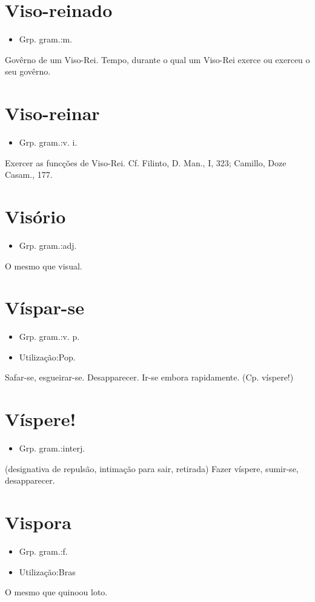 \documentclass{article}
\begin{document}
\section{Viso-reinado}
\begin{itemize}
\item {Grp. gram.:m.}
\end{itemize}
Govêrno de um Viso-Rei.
Tempo, durante o qual um Viso-Rei exerce ou exerceu o seu govêrno.
\section{Viso-reinar}
\begin{itemize}
\item {Grp. gram.:v. i.}
\end{itemize}
Exercer as funcções de Viso-Rei. Cf. Filinto, \textunderscore D. Man.\textunderscore , I, 323; Camillo, \textunderscore Doze Casam.\textunderscore , 177.
\section{Visório}
\begin{itemize}
\item {Grp. gram.:adj.}
\end{itemize}
O mesmo que \textunderscore visual\textunderscore .
\section{Víspar-se}
\begin{itemize}
\item {Grp. gram.:v. p.}
\end{itemize}
\begin{itemize}
\item {Utilização:Pop.}
\end{itemize}
Safar-se, esgueirar-se.
Desapparecer.
Ir-se embora rapidamente.
(Cp. \textunderscore víspere!\textunderscore )
\section{Víspere!}
\begin{itemize}
\item {Grp. gram.:interj.}
\end{itemize}
(designativa de \textunderscore repulsão\textunderscore , \textunderscore intimação para sair\textunderscore , \textunderscore retirada\textunderscore )
\textunderscore Fazer víspere\textunderscore , sumir-se, desapparecer.
\section{Vispora}
\begin{itemize}
\item {Grp. gram.:f.}
\end{itemize}
\begin{itemize}
\item {Utilização:Bras}
\end{itemize}
O mesmo que \textunderscore quino\textunderscore  ou \textunderscore loto\textunderscore .
\end{document}
